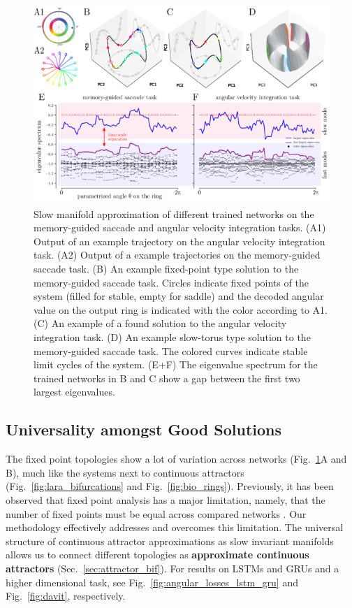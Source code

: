 \documentclass{article} %
\newcounter{ct}
\theoremstyle{definition}
\theoremstyle{remark}
\begin{document}
\begin{figure}[tbhp]
  \centering
  \includegraphics[width=.95\textwidth]{fastslow_decomposition_m_normhyp}
  \caption{Slow manifold approximation of different trained networks on the memory-guided saccade and angular velocity integration tasks.
 (A1) Output of an example trajectory on the angular velocity integration task.
 (A2) Output of a example trajectories on the memory-guided saccade task.
 (B) An example fixed-point type solution to the memory-guided saccade task. Circles indicate fixed points of the system (filled for stable, empty for saddle) and the decoded angular value on the output ring is indicated with the color according to A1.
 (C) An example of a found solution to the angular velocity integration task.
 (D) An example slow-torus type solution to the memory-guided saccade task. The colored curves indicate stable limit cycles of the system.
 (E+F) The eigenvalue spectrum for the trained networks in B and C show a gap between the first two largest eigenvalues.
}\label{fig:fastslow_decomposition}
\end{figure}

\subsection{Universality amongst Good Solutions}
The fixed point topologies show a lot of variation across networks (Fig.~\ref{fig:fastslow_decomposition}A and B),
 much like the systems next to continuous attractors (Fig.~\ref{fig:lara_bifurcations} and Fig.~\ref{fig:bio_rings}).
Previously, it has been observed that fixed point analysis has a major limitation, namely, that the number of fixed points must be equal across compared networks  \citep{maheswaranathan2019universality}.
Our methodology effectively addresses and overcomes this limitation.
The universal structure of continuous attractor approximations as slow invariant manifolds allows us to connect different topologies as \textbf{approximate continuous attractors} (Sec.~\ref{sec:attractor_bif}).
For results on LSTMs and GRUs and a higher dimensional task, see Fig.~\ref{fig:angular_losses_lstm_gru} and Fig.~\ref{fig:davit}, respectively.
\end{document}

